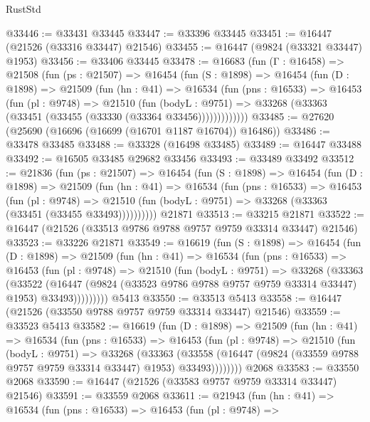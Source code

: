\begin{lexlean}{RustStd}
\begin{coremodule}
@33446 := @33431 @33445
@33447 := @33396 @33445
@33451 := @16447 (@21526 (@33316 @33447) @21546)
@33455 := @16447 (@9824 (@33321 @33447) @1953)
@33456 := @33406 @33445
@33478 := @16683
    (fun (Γ : @16458) =>
    @21508
      (fun (ps : @21507) =>
      @16454
        (fun (S : @1898) =>
        @16454
          (fun (D : @1898) =>
          @21509
            (fun (hn : @41) =>
            @16534
              (fun (pns : @16533) =>
              @16453
                (fun (pl : @9748) =>
                @21510
                  (fun (bodyL : @9751) =>
                  @33268 (@33363 (@33451 (@33455 (@33330 (@33364 @33456)))))))))))))
@33485 := @27620 (@25690 (@16696 (@16699 (@16701 @1187 @16704)) @16486))
@33486 := @33478 @33485
@33488 := @33328 (@16498 @33485)
@33489 := @16447 @33488
@33492 := @16505 @33485 @29682 @33456
@33493 := @33489 @33492
@33512 := @21836
    (fun (ps : @21507) =>
    @16454
      (fun (S : @1898) =>
      @16454
        (fun (D : @1898) =>
        @21509
          (fun (hn : @41) =>
          @16534
            (fun (pns : @16533) =>
            @16453
              (fun (pl : @9748) =>
              @21510 (fun (bodyL : @9751) => @33268 (@33363 (@33451 (@33455 @33493))))))))))
    @21871
@33513 := @33215 @21871
@33522 := @16447 (@21526 (@33513 @9786 @9788 @9757 @9759 @33314 @33447) @21546)
@33523 := @33226 @21871
@33549 := @16619
    (fun (S : @1898) =>
    @16454
      (fun (D : @1898) =>
      @21509
        (fun (hn : @41) =>
        @16534
          (fun (pns : @16533) =>
          @16453
            (fun (pl : @9748) =>
            @21510
              (fun (bodyL : @9751) =>
              @33268
                (@33363
                  (@33522
                    (@16447
                      (@9824 (@33523 @9786 @9788 @9757 @9759 @33314 @33447) @1953)
                      @33493)))))))))
    @5413
@33550 := @33513 @5413
@33558 := @16447 (@21526 (@33550 @9788 @9757 @9759 @33314 @33447) @21546)
@33559 := @33523 @5413
@33582 := @16619
    (fun (D : @1898) =>
    @21509
      (fun (hn : @41) =>
      @16534
        (fun (pns : @16533) =>
        @16453
          (fun (pl : @9748) =>
          @21510
            (fun (bodyL : @9751) =>
            @33268
              (@33363
                (@33558
                  (@16447 (@9824 (@33559 @9788 @9757 @9759 @33314 @33447) @1953) @33493))))))))
    @2068
@33583 := @33550 @2068
@33590 := @16447 (@21526 (@33583 @9757 @9759 @33314 @33447) @21546)
@33591 := @33559 @2068
@33611 := @21943
    (fun (hn : @41) =>
    @16534
      (fun (pns : @16533) =>
      @16453
        (fun (pl : @9748) =>

\end{coremodule}
\end{lexlean}
